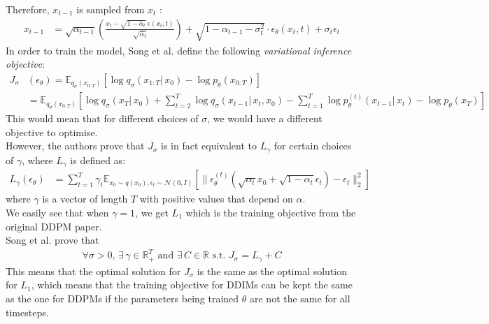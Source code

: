 \documentclass{article}
\begin{document}
Therefore, $x_{t-1}$ is sampled from $x_t$ \cite{song2022denoising}: 
\begin{align}
  x_{t-1} &= \sqrt{\alpha_{t-1}} \left( \frac{x_t - \sqrt{1 - \bar{\alpha}_t} \: \epsilon(x_t, t)}{\sqrt{\bar{\alpha}_t}} \right) + \sqrt{1 - \alpha_{t-1} - \sigma_t^2} \cdot \epsilon_\theta (x_t, t) + \sigma_t \epsilon_t
\end{align}
In order to train the model, Song et al. \cite{song2022denoising} define the following \textit{variational inference objective}:
\begin{align}
  J_\sigma & (\epsilon_\theta) = \mathbb{E}_{q_\sigma (x_{0:T})} \left[ \log q_\sigma (x_{1:T} | \, x_0) - \log p_\theta (x_{0:T}) \right] \\
  &= \mathbb{E}_{q_\sigma (x_{0:T})} \left[ \log q_\sigma (x_T | \, x_0) + \sum_{t=2}^{T} \log q_\sigma (x_{t-1} | \, x_t, x_0) - \sum_{t=1}^{T} \log p_\theta^{(t)} (x_{t-1} | \, x_t) - \log p_\theta (x_T) \right]
\end{align}
This would mean that for different choices of $\sigma$, we would have a different objective to optimise. \cite{song2022denoising} \\
However, the authors \cite{song2022denoising} prove that $J_\sigma$ is in fact equivalent to $L_\gamma$ for certain choices of $\gamma$, where $L_\gamma$ is defined as:
\begin{align}
  L_\gamma (\epsilon_\theta) &= \sum_{t=1}^{T} \gamma_t \mathbb{E}_{x_0 \sim q(x_0), \epsilon_t \sim \mathcal{N}(0, I)}  \left[ \| \epsilon_\theta^{(t)} (\sqrt{\alpha_t} x_0 + \sqrt{1 - \alpha_t} \epsilon_t) - \epsilon_t \|_2^2 \right]
\end{align}
where $\gamma$ is a vector of length $T$ with positive values that depend on $\alpha$. \\
We easily see that when $\gamma = 1$, we get $L_1$ which is the training objective from the original DDPM paper. \cite{ho2020denoising, song2022denoising} \\
Song et al. prove that
\begin{align}
  \forall \sigma > 0, \, \exists \, \gamma \in \mathbb{R}_+^T \text{ and } \exists \, C \in \mathbb{R} \text{ s.t. } J_\sigma = L_\gamma + C
\end{align}
This means that the optimal solution for $J_\sigma$ is the same as the optimal solution for $L_1$, which means that the training objective for DDIMs can be kept the same as the one for DDPMs if the parameters being trained $\theta$ are not the same for all timesteps. \cite{song2022denoising}
\end{document}

